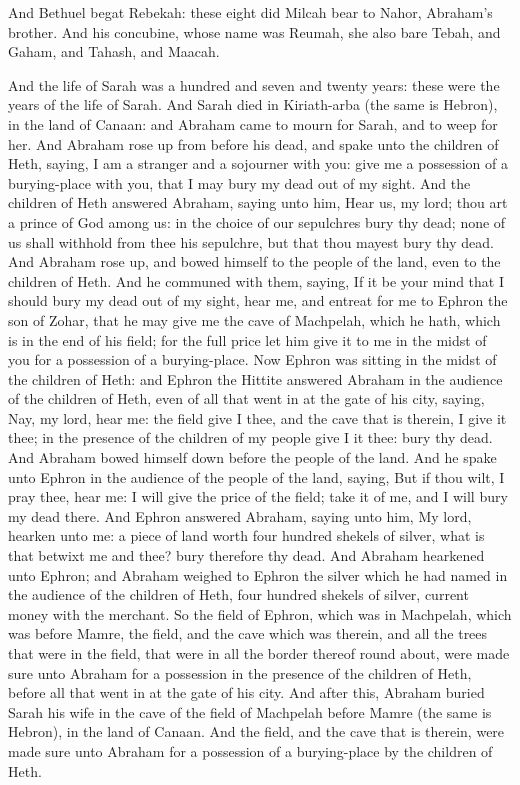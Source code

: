 And Bethuel begat Rebekah: these eight did Milcah bear to Nahor, Abraham’s brother. And his concubine, whose name was Reumah, she also bare Tebah, and Gaham, and Tahash, and Maacah. 

And the life of Sarah was a hundred and seven and twenty years: these were the years of the life of Sarah. And Sarah died in Kiriath-arba (the same is Hebron), in the land of Canaan: and Abraham came to mourn for Sarah, and to weep for her. And Abraham rose up from before his dead, and spake unto the children of Heth, saying, I am a stranger and a sojourner with you: give me a possession of a burying-place with you, that I may bury my dead out of my sight. And the children of Heth answered Abraham, saying unto him, Hear us, my lord; thou art a prince of God among us: in the choice of our sepulchres bury thy dead; none of us shall withhold from thee his sepulchre, but that thou mayest bury thy dead. And Abraham rose up, and bowed himself to the people of the land, even to the children of Heth. And he communed with them, saying, If it be your mind that I should bury my dead out of my sight, hear me, and entreat for me to Ephron the son of Zohar, that he may give me the cave of Machpelah, which he hath, which is in the end of his field; for the full price let him give it to me in the midst of you for a possession of a burying-place. Now Ephron was sitting in the midst of the children of Heth: and Ephron the Hittite answered Abraham in the audience of the children of Heth, even of all that went in at the gate of his city, saying, Nay, my lord, hear me: the field give I thee, and the cave that is therein, I give it thee; in the presence of the children of my people give I it thee: bury thy dead. And Abraham bowed himself down before the people of the land. And he spake unto Ephron in the audience of the people of the land, saying, But if thou wilt, I pray thee, hear me: I will give the price of the field; take it of me, and I will bury my dead there. And Ephron answered Abraham, saying unto him, My lord, hearken unto me: a piece of land worth four hundred shekels of silver, what is that betwixt me and thee? bury therefore thy dead. And Abraham hearkened unto Ephron; and Abraham weighed to Ephron the silver which he had named in the audience of the children of Heth, four hundred shekels of silver, current money with the merchant.  So the field of Ephron, which was in Machpelah, which was before Mamre, the field, and the cave which was therein, and all the trees that were in the field, that were in all the border thereof round about, were made sure unto Abraham for a possession in the presence of the children of Heth, before all that went in at the gate of his city. And after this, Abraham buried Sarah his wife in the cave of the field of Machpelah before Mamre (the same is Hebron), in the land of Canaan. And the field, and the cave that is therein, were made sure unto Abraham for a possession of a burying-place by the children of Heth. 

